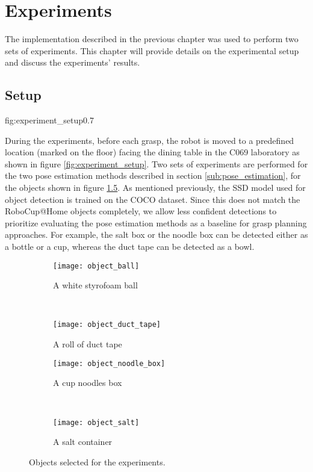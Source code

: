 
\chapter{Experiments}

The implementation described in the previous chapter was used to perform two sets of experiments. This chapter will
provide details on the experimental setup and discuss the experiments' results.


\section{Setup}

{fig:experiment_setup}{0.7\textwidth}

During the experiments, before each grasp, the robot is moved to a predefined location (marked on the floor) facing the
dining table in the C069 laboratory as shown in figure \ref{fig:experiment_setup}. Two sets of experiments are performed
for the two pose estimation methods described in section \ref{sub:pose_estimation}, for the objects shown in figure
\ref{fig:objects}. As mentioned previously, the SSD model used for object detection is trained on the COCO dataset.
Since this does not match the RoboCup@Home objects completely, we allow less confident detections to prioritize
evaluating the pose estimation methods as a baseline for grasp planning approaches. For example, the salt box or the
noodle box can be detected either as a bottle or a cup, whereas the duct tape can be detected as a bowl.

\begin{figure}[h!]
    \centering
    \small
    \begin{subfigure}[b]{0.4\textwidth}
        \texttt{[image: object\_ball]}
        \caption{A white styrofoam ball}
        \label{fig:object_ball}
    \end{subfigure}
    ~
    \begin{subfigure}[b]{0.4\textwidth}
        \texttt{[image: object\_duct\_tape]}
        \caption{A roll of duct tape}
        \label{fig:object_duct_tape}
    \end{subfigure}

    \begin{subfigure}[b]{0.4\textwidth}
        \texttt{[image: object\_noodle\_box]}
        \caption{A cup noodles box}
        \label{fig:object_noodle_box}
    \end{subfigure}
    ~
    \begin{subfigure}[b]{0.4\textwidth}
        \texttt{[image: object\_salt]}
        \caption{A salt container}
        \label{fig:object_salt}
    \end{subfigure}
    \caption{Objects selected for the experiments.}\label{fig:objects}
\end{figure}

